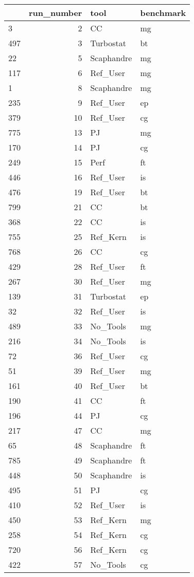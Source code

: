 \begin{tabular}{lrll}
\toprule
 & run_number & tool & benchmark \\
\midrule
3 & 2 & CC & mg \\
497 & 3 & Turbostat & bt \\
22 & 5 & Scaphandre & mg \\
117 & 6 & Ref_User & mg \\
1 & 8 & Scaphandre & mg \\
235 & 9 & Ref_User & ep \\
379 & 10 & Ref_User & cg \\
775 & 13 & PJ & mg \\
170 & 14 & PJ & cg \\
249 & 15 & Perf & ft \\
446 & 16 & Ref_User & is \\
476 & 19 & Ref_User & bt \\
799 & 21 & CC & bt \\
368 & 22 & CC & is \\
755 & 25 & Ref_Kern & is \\
768 & 26 & CC & cg \\
429 & 28 & Ref_User & ft \\
267 & 30 & Ref_User & mg \\
139 & 31 & Turbostat & ep \\
32 & 32 & Ref_User & is \\
489 & 33 & No_Tools & mg \\
216 & 34 & No_Tools & is \\
72 & 36 & Ref_User & cg \\
51 & 39 & Ref_User & mg \\
161 & 40 & Ref_User & bt \\
190 & 41 & CC & ft \\
196 & 44 & PJ & cg \\
217 & 47 & CC & mg \\
65 & 48 & Scaphandre & ft \\
785 & 49 & Scaphandre & ft \\
448 & 50 & Scaphandre & is \\
495 & 51 & PJ & cg \\
410 & 52 & Ref_User & is \\
450 & 53 & Ref_Kern & mg \\
258 & 54 & Ref_Kern & cg \\
720 & 56 & Ref_Kern & cg \\
422 & 57 & No_Tools & cg \\

\end{tabular}
